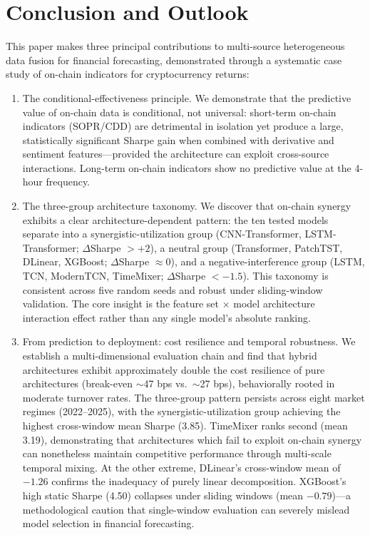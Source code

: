 \documentclass[a4paper]{cas-dc}
\begin{document}
\section{Conclusion and Outlook}

This paper makes three principal contributions to multi-source heterogeneous data fusion for financial forecasting, demonstrated through a systematic case study of on-chain indicators for cryptocurrency returns:

\begin{enumerate}[label=(\arabic*),leftmargin=1.5em]
    \item The conditional-effectiveness principle. We demonstrate that the predictive value of on-chain data is conditional, not universal: short-term on-chain indicators (SOPR/CDD) are detrimental in isolation yet produce a large, statistically significant Sharpe gain when combined with derivative and sentiment features---provided the architecture can exploit cross-source interactions. Long-term on-chain indicators show no predictive value at the 4-hour frequency.
    \item The three-group architecture taxonomy. We discover that on-chain synergy exhibits a clear architecture-dependent pattern: the ten tested models separate into a synergistic-utilization group (CNN-Transformer, LSTM-Transformer; $\Delta$Sharpe $> +2$), a neutral group (Transformer, PatchTST, DLinear, XGBoost; $\Delta$Sharpe $\approx 0$), and a negative-interference group (LSTM, TCN, ModernTCN, TimeMixer; $\Delta$Sharpe $< -1.5$). This taxonomy is consistent across five random seeds and robust under sliding-window validation. The core insight is the feature set $\times$ model architecture interaction effect rather than any single model's absolute ranking.
    \item From prediction to deployment: cost resilience and temporal robustness. We establish a multi-dimensional evaluation chain and find that hybrid architectures exhibit approximately double the cost resilience of pure architectures (break-even $\sim$47 bps vs.\ $\sim$27 bps), behaviorally rooted in moderate turnover rates. The three-group pattern persists across eight market regimes (2022--2025), with the synergistic-utilization group achieving the highest cross-window mean Sharpe (3.85). TimeMixer ranks second (mean 3.19), demonstrating that architectures which fail to exploit on-chain synergy can nonetheless maintain competitive performance through multi-scale temporal mixing. At the other extreme, DLinear's cross-window mean of $-1.26$ confirms the inadequacy of purely linear decomposition. XGBoost's high static Sharpe (4.50) collapses under sliding windows (mean $-0.79$)---a methodological caution that single-window evaluation can severely mislead model selection in financial forecasting.
\end{enumerate}
\end{document}
